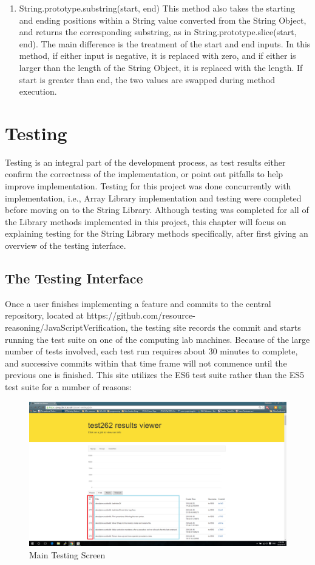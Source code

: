 \documentclass[a4paper,11pt,twoside]{report}
\begin{document}
\begin{enumerate}
\item String.prototype.substring(start, end) \newline
This method also takes the starting and ending positions within a String value converted from the String Object, and returns the corresponding substring, as in String.prototype.slice(start, end). The main difference is the treatment of the start and end inputs. In this method, if either input is negative, it is replaced with zero, and if either is larger than the length of the String Object, it is replaced with the length. If start is greater than end, the two values are swapped during method execution.
\end{enumerate}

\chapter{Testing}
Testing is an integral part of the development process, as test results either confirm the correctness of the implementation, or point out pitfalls to help improve implementation. Testing for this project was done concurrently with implementation, i.e., Array Library implementation and testing were completed before moving on to the String Library. Although testing was completed for all of the Library methods implemented in this project, this chapter will focus on explaining testing for the String Library methods specifically, after first giving an overview of the testing interface.

\section{The Testing Interface}
Once a user finishes implementing a feature and commits to the central repository, located at https://github.com/resource-reasoning/JavaScriptVerification, the testing site records the commit and starts running the test suite on one of the computing lab machines. Because of the large number of tests involved, each test run requires about 30 minutes to complete, and successive commits within that time frame will not commence until the previous one is finished. This site utilizes the ES6 test suite rather than the ES5 test suite for a number of reasons: %

\begin{figure}[h!]
  \caption{Main Testing Screen}
  \includegraphics[width=1.0\textwidth]{main_testing_screen_boxed}
\end{figure}
\end{document}
